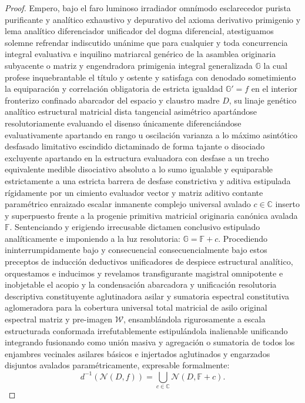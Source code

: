 \documentclass[11pt,a4paper]{article}
\theoremstyle{definition}
\theoremstyle{remark}
\numberwithin{equation}{section}
\begin{document}
\begin{proof}
Empero, bajo el faro luminoso irradiador omnímodo esclarecedor purista purificante y analítico exhaustivo y depurativo del axioma derivativo primigenio y lema analítico diferenciador unificador del dogma diferencial, atestiguamos solemne refrendar indiscutido unánime que para cualquier y toda concurrencia integral evaluativa e inquilino matriarcal genérico de la asamblea originaria subyacente o matriz y engendradora primigenia integral generalizada $\mathbb{G}$ la cual profese inquebrantable el título y ostente y satisfaga con denodado sometimiento la equiparación y correlación obligatoria de estricta igualdad $\mathbb{G}' = f$ en el interior fronterizo confinado abarcador del espacio y claustro madre $D$, su linaje genético analítico estructural matricial dista tangencial asimétrico apartándose resolutoriamente evaluando el disenso únicamente diferenciándose evaluativamente apartando en rango u oscilación varianza a lo máximo asintótico desfasado limitativo escindido dictaminado de forma tajante o disociado excluyente apartando en la estructura evaluadora con desfase a un trecho equivalente medible disociativo absoluto a lo sumo igualable y equiparable estrictamente a una estricta barrera de desfase constrictiva y aditiva estipulada rígidamente por un cimiento evaluador vector y matriz aditivo contante paramétrico enraizado escalar inmanente complejo universal avalado $c \in \mathbb{C}$ inserto y superpuesto frente a la progenie primitiva matricial originaria canónica avalada $\mathbb{F}$. Sentenciando y erigiendo irrecusable dictamen conclusivo estipulado analíticamente e imponiendo a la luz resolutoria: $\mathbb{G} = \mathbb{F} + c$.
Procediendo ininterrumpidamente bajo y consecuencial consecuencialmente bajo estos preceptos de inducción deductivos unificadores de despiece estructural analítico, orquestamos e inducimos y revelamos transfigurante magistral omnipotente e inobjetable el acopio y la condensación abarcadora y unificación resolutoria descriptiva constituyente aglutinadora asilar y sumatoria espectral constitutiva aglomeradora para la cobertura universal total matricial de asilo original espectral matriz y pre-imagen $\mathcal{W}$, ensamblándola rigurosamente a escala estructurada conformada irrefutablemente estipulándola inalienable unificando integrando fusionando como unión masiva y agregación o sumatoria de todos los enjambres vecinales asilares básicos e injertados aglutinados y engarzados disjuntos avalados paramétricamente, expresable formalmente:
\begin{equation}
d^{-1}(\mathcal{N}(D, f)) = \bigcup_{c \in \mathbb{C}} \mathcal{N}(D, \mathbb{F} + c).

\end{equation}
\end{proof}
\end{document}
